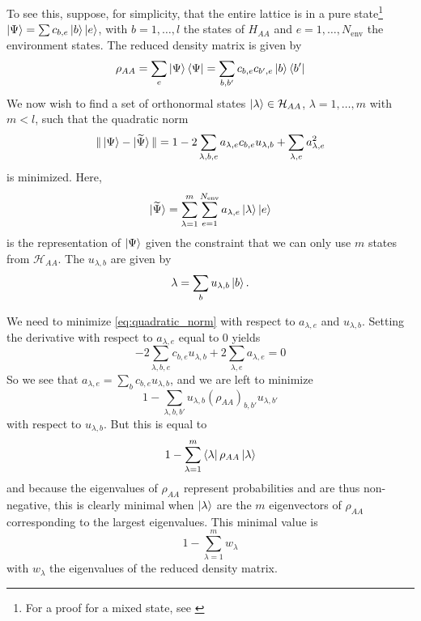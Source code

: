 To see this, suppose, for simplicity, that the entire lattice is in a pure
state\footnote{For a proof for a mixed state, see \cite{noack1999workshop}} $\ket{\Psi} = \sum c_{b, e} \ket{b} \ket{e}$, with $b = 1, \ldots, l$ the
states of $H_{AA}$ and $e = 1, \ldots, N_{\text{env}}$ the environment states. The
reduced density matrix is given by
\begin{equation}\label{eq:density_matrix_superblock}
  \rho_{AA} = \sum_{e} \ket{\Psi} \bra{\Psi} = \sum_{b, b'} c_{b, e} c_{b', e} \ket{b} \bra{b'}
\end{equation}
We now wish to find a set of orthonormal states $\ket{\lambda} \in \mathcal{H}_{AA}$,
$\lambda = 1, \ldots, m$ with $m < l$, such that the quadratic norm
\begin{equation}\label{eq:quadratic_norm}
  \Vert \ket{\Psi} - \ket{\widetilde{\Psi}} \Vert = 1 - 2 \sum_{\lambda, b, e} a_{\lambda, e} c_{b, e} u_{\lambda, b} + \sum_{\lambda, e} a_{\lambda, e}^2
\end{equation}
is minimized. Here,
\begin{equation}
  \ket{\widetilde{\Psi}} = \sum_{\lambda = 1}^{m} \sum_{e = 1}^{N_{\text{env}}} a_{\lambda, e} \ket{\lambda} \ket{e}
\end{equation}
is the representation of $\ket{\Psi}$ given the constraint that we can only use
$m$ states from $\mathcal{H}_{AA}$. The $u_{\lambda, b}$ are given by
\begin{equation}
  \lambda = \sum_{b} u_{\lambda, b} \ket{b}.
\end{equation}

We need to minimize \eqref{eq:quadratic_norm} with respect to $a_{\lambda, e}$
and $u_{\lambda, b}$. Setting the derivative with respect to $a_{\lambda, e}$ equal to 0 yields
\begin{equation}
  -2 \sum_{\lambda, b, e} c_{b, e} u_{\lambda, b} + 2 \sum_{\lambda, e} a_{\lambda, e} = 0
\end{equation}
So we see that $a_{\lambda, e} = \sum_{b} c_{b, e} u_{\lambda, b}$, and we are left to minimize
\begin{equation}
  1 - \sum_{\lambda, b, b'} u_{\lambda, b} (\rho_{AA})_{b, b'} u_{\lambda, b'}
\end{equation}
with respect to $u_{\lambda, b}$. But this is equal to
\begin{equation}
  1 - \sum_{\lambda = 1}^{m} \bra{\lambda} \rho_{AA} \ket{\lambda}
\end{equation}
and because the eigenvalues of $\rho_{AA}$ represent probabilities and are thus
non-negative, this is clearly minimal when $\ket{\lambda}$ are the $m$
eigenvectors of $\rho_{AA}$ corresponding to the largest eigenvalues. This minimal value is
\begin{equation}\label{eq:truncation_error}
  1 - \sum_{\lambda = 1}^{m} w_{\lambda}
\end{equation}
with $w_{\lambda}$ the eigenvalues of the reduced density matrix.

